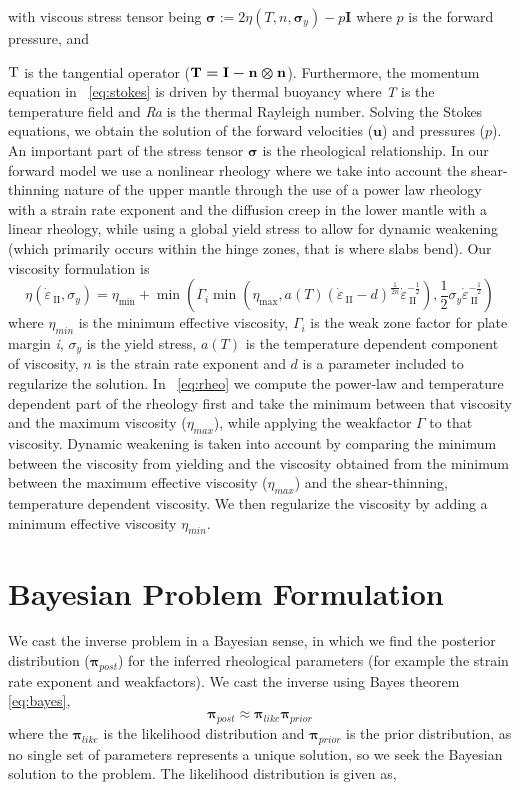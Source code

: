 \documentclass[12pt]{article}
\newcommand{\IIinv}{{\dot\varepsilon}_{\mathrm{\!\!\:II}}}
\newcommand{\uu}{{\ensuremath{\boldsymbol{u}}}}
\newcommand{\ppi}{{\ensuremath{\boldsymbol{\pi}}}}
\newcommand{\ssigma}{{\ensuremath{\boldsymbol{\sigma}}}}
\begin{document}
with viscous stress tensor being  $\ssigma := 2\eta(T,n,\ssigma_y)-p\textbf{I}$ where $p$ is the forward pressure, and {$\boldmath{\mathrm{T}}$ is the tangential operator ($\boldmath{\mathrm{T}} = \textbf{I} - \textbf{n} \otimes \textbf{n}$). Furthermore, the momentum equation in ~\eqref{eq:stokes} is driven by thermal buoyancy where \textit{T} is the temperature field and \textit{Ra} is the thermal Rayleigh number. Solving the Stokes equations, we obtain the solution of the forward velocities ($\uu$) and pressures ($p$). An important part of the stress tensor $\ssigma$ is the rheological relationship. In our forward model we use a nonlinear rheology where we take into account the shear-thinning nature of the upper mantle through the use of a power law rheology with a strain rate exponent
and the diffusion creep in the lower mantle with a linear rheology, while using a global yield stress to allow for dynamic weakening (which primarily occurs within the hinge zones, that is where slabs bend). 
Our viscosity formulation is 
\begin{equation}
    \eta(\IIinv,\sigma_{y}) =
\eta_{\min} + \min(\Gamma_i\min(\eta_{\max},a(T)(\IIinv-d)^{\frac{1}{2n}}\IIinv^{-\frac{1}{2}}),
\frac{1}{2}\sigma_y\IIinv^{-\frac{1}{2}})
\label{eq:rheo}
  \end{equation}
where $\eta_{min}$ is the minimum effective viscosity, $\Gamma_i$ is the weak zone factor for plate margin \textit{i}, $\sigma_y$ is the yield stress, $a(T)$ is the temperature dependent component of viscosity, $n$ is the strain rate exponent and $d$ is a parameter included to regularize the solution. In ~\eqref{eq:rheo} we compute the power-law and temperature dependent part of the rheology first and take the minimum between that viscosity and the maximum viscosity ($\eta_{max}$), while applying the weakfactor $\Gamma$ to that viscosity. Dynamic weakening is taken into account by comparing the minimum between the viscosity from yielding and the viscosity obtained from the minimum between the maximum effective viscosity ($\eta_{max}$) and the shear-thinning, temperature dependent viscosity. We then regularize the viscosity by adding a minimum effective viscosity $\eta_{min}$.

\section{Bayesian Problem Formulation}
We cast the inverse problem in a Bayesian sense, in which we find the posterior distribution ($\ppi_{post}$) for the inferred rheological parameters (for example the strain rate exponent and weakfactors). 
We cast the inverse using Bayes theorem \eqref{eq:bayes},
\begin{equation}
\ppi_{post} \approx \ppi_{like}\ppi_{prior}
\label{eq:bayes}
\end{equation}
where the $\ppi_{like}$ is the likelihood distribution and $\ppi_{prior}$ is the prior distribution, as 
no single set of parameters represents a unique solution, so we seek the Bayesian solution to the problem. The likelihood distribution is given as,

}
\end{document}

